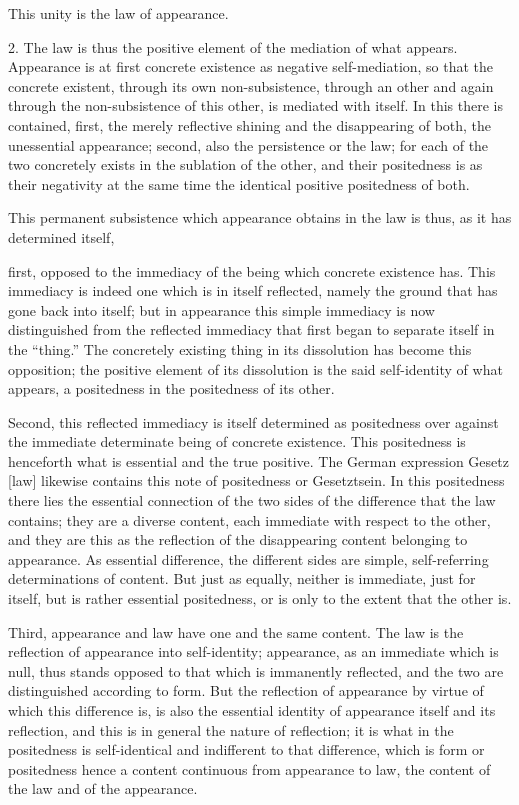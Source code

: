 This unity is the law of appearance.

2. The law is thus the positive element of the mediation of what appears.
Appearance is at first concrete existence as negative self-mediation,
so that the concrete existent, through its own non-subsistence,
through an other and again through the non-subsistence of this other,
is mediated with itself.
In this there is contained, first,
the merely reflective shining and the disappearing of both,
the unessential appearance;
second, also the persistence or the law;
for each of the two concretely exists in the sublation of the other,
and their positedness is as their negativity at the same time
the identical positive positedness of both.

This permanent subsistence which appearance obtains in the law is thus,
as it has determined itself,

first, opposed to the immediacy
of the being which concrete existence has.
This immediacy is indeed one which is in itself reflected,
namely the ground that has gone back into itself;
but in appearance this simple immediacy is now distinguished
from the reflected immediacy that first began
to separate itself in the “thing.”
The concretely existing thing in its dissolution
has become this opposition;
the positive element of its dissolution is
the said self-identity of what appears,
a positedness in the positedness of its other.

Second, this reflected immediacy is itself determined
as positedness over against the immediate determinate being
of concrete existence.
This positedness is henceforth what is essential
and the true positive.
The German expression Gesetz [law] likewise contains this
note of positedness or Gesetztsein.
In this positedness there lies the essential connection of
the two sides of the difference that the law contains;
they are a diverse content, each immediate with respect to the other,
and they are this as the reflection of the disappearing content
belonging to appearance.
As essential difference, the different sides are
simple, self-referring determinations of content.
But just as equally, neither is immediate,
just for itself, but is rather essential positedness,
or is only to the extent that the other is.

Third, appearance and law have one and the same content.
The law is the reflection of appearance into self-identity;
appearance, as an immediate which is null,
thus stands opposed to that which is immanently reflected,
and the two are distinguished according to form.
But the reflection of appearance by virtue of which this difference is,
is also the essential identity of appearance itself and its reflection,
and this is in general the nature of reflection;
it is what in the positedness is self-identical
and indifferent to that difference,
which is form or positedness hence a content continuous
from appearance to law, the content of the law and of the appearance.

